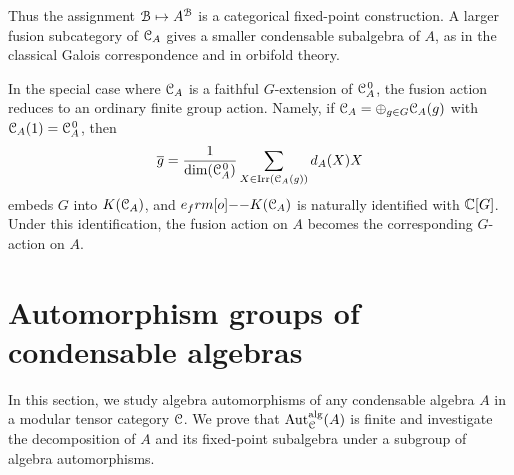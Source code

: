 \documentclass{amsart}
\begin{document}
Thus the assignment ${\EuScript{B}}\mapsto A^{\EuScript{B}}$ is a categorical fixed-point
construction. A larger fusion subcategory of ${{\EuScript{C}}_A}$ gives a smaller
condensable subalgebra of $A$, as in the classical Galois correspondence
and in orbifold theory. 

In the special case where ${{\EuScript{C}}_A}$ is a faithful $G$-extension of ${{\EuScript{C}}_A^{\hspace{1pt}0}}$, the
fusion action reduces to an ordinary finite group action. Namely, if
${{\EuScript{C}}_A}=\oplus_{g\in G}{{\EuScript{C}}_A}(g)$ with ${{\EuScript{C}}_A}(1)={{\EuScript{C}}_A^{\hspace{1pt}0}}$, then
\[
\overline g=\frac{1}{\dim({{\EuScript{C}}_A^{\hspace{1pt}0}})}
\sum_{X\in\operatorname{Irr}({{\EuScript{C}}_A}(g))}d_A(X)X
\]
embeds $G$ into $K({{\EuScript{C}}_A})$, and $e_\1K(\CA)$ is naturally identified with
$\mathbb{C}[G]$. Under this identification, the fusion action on $A$ becomes the
corresponding $G$-action on $A$.


\section{Automorphism groups of condensable algebras}

In this section, we study algebra automorphisms of any condensable algebra $A$ in a modular tensor category ${\EuScript{C}}$. We prove that ${\operatorname{Aut}_{\EuScript{C}}^{\operatorname{alg}}}(A)$ is finite and investigate the decomposition of $A$ and its fixed-point subalgebra under a subgroup of algebra automorphisms.
\end{document}
